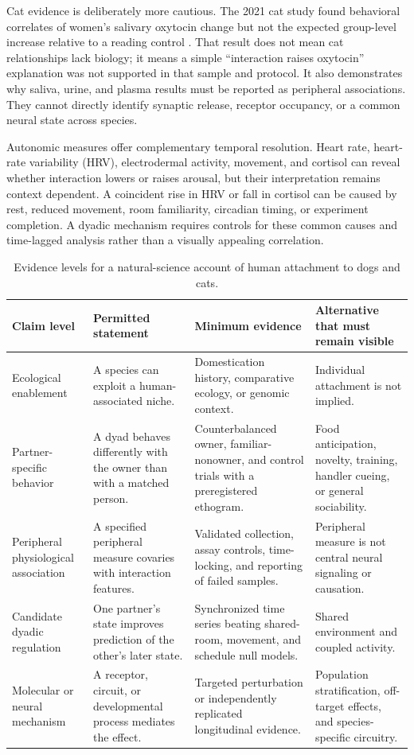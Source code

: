 \documentclass[conference]{IEEEtran}
\begin{document}
Cat evidence is deliberately more cautious. The 2021 cat study found behavioral correlates of women's salivary oxytocin change but not the expected group-level increase relative to a reading control \cite{johnson2021}. That result does not mean cat relationships lack biology; it means a simple ``interaction raises oxytocin'' explanation was not supported in that sample and protocol. It also demonstrates why saliva, urine, and plasma results must be reported as peripheral associations. They cannot directly identify synaptic release, receptor occupancy, or a common neural state across species.

Autonomic measures offer complementary temporal resolution. Heart rate, heart-rate variability (HRV), electrodermal activity, movement, and cortisol can reveal whether interaction lowers or raises arousal, but their interpretation remains context dependent. A coincident rise in HRV or fall in cortisol can be caused by rest, reduced movement, room familiarity, circadian timing, or experiment completion. A dyadic mechanism requires controls for these common causes and time-lagged analysis rather than a visually appealing correlation.

\begin{table}[t]
\caption{Evidence levels for a natural-science account of human attachment to dogs and cats.}
\label{tab:claim-ladder}
\centering
\footnotesize
\begin{tabular}{p{}p{}p{}p{}}
\toprule
\textbf{Claim level} & \textbf{Permitted statement} & \textbf{Minimum evidence} & \textbf{Alternative that must remain visible} \\
\midrule
Ecological enablement & A species can exploit a human-associated niche. & Domestication history, comparative ecology, or genomic context. & Individual attachment is not implied. \\
Partner-specific behavior & A dyad behaves differently with the owner than with a matched person. & Counterbalanced owner, familiar-nonowner, and control trials with a preregistered ethogram. & Food anticipation, novelty, training, handler cueing, or general sociability. \\
Peripheral physiological association & A specified peripheral measure covaries with interaction features. & Validated collection, assay controls, time-locking, and reporting of failed samples. & Peripheral measure is not central neural signaling or causation. \\
Candidate dyadic regulation & One partner's state improves prediction of the other's later state. & Synchronized time series beating shared-room, movement, and schedule null models. & Shared environment and coupled activity. \\
Molecular or neural mechanism & A receptor, circuit, or developmental process mediates the effect. & Targeted perturbation or independently replicated longitudinal evidence. & Population stratification, off-target effects, and species-specific circuitry. \\
\bottomrule
\end{tabular}
\end{table}
\end{document}
